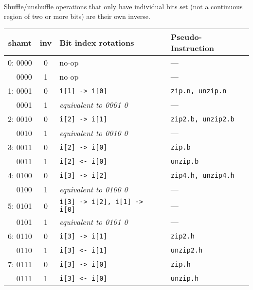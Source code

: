 Shuffle/unshuffle operations that only have individual bits set (not a continuous
region of two or more bits) are their own inverse.

\begin{table}[h]
\begin{small}
\begin{center}
\begin{tabular}{r c l l}
\multicolumn{1}{c}{shamt} &
\multicolumn{1}{c}{inv} &
Bit index rotations &
Pseudo-Instruction \\

\hline

 0: 0000 & 0 & no-op                            & ---                    \\
    0000 & 1 & no-op                            & ---                    \\
 1: 0001 & 0 & {\tt i[1] -> i[0]}               & {\tt zip.n, unzip.n}   \\
    0001 & 1 & {\it equivalent to 0001 0}       & ---                    \\
 2: 0010 & 0 & {\tt i[2] -> i[1]}               & {\tt zip2.b, unzip2.b} \\
    0010 & 1 & {\it equivalent to 0010 0}       & ---                    \\
 3: 0011 & 0 & {\tt i[2] -> i[0]}               & {\tt zip.b}            \\
    0011 & 1 & {\tt i[2] <- i[0]}               & {\tt unzip.b}          \\

\hline

 4: 0100 & 0 & {\tt i[3] -> i[2]}               & {\tt zip4.h, unzip4.h} \\
    0100 & 1 & {\it equivalent to 0100 0}       & ---                    \\
 5: 0101 & 0 & {\tt i[3] -> i[2], i[1] -> i[0]} & ---                    \\
    0101 & 1 & {\it equivalent to 0101 0}       & ---                    \\
 6: 0110 & 0 & {\tt i[3] -> i[1]}               & {\tt zip2.h}           \\
    0110 & 1 & {\tt i[3] <- i[1]}               & {\tt unzip2.h}         \\
 7: 0111 & 0 & {\tt i[3] -> i[0]}               & {\tt zip.h}            \\
    0111 & 1 & {\tt i[3] <- i[0]}               & {\tt unzip.h}          \\


\end{tabular}
\end{center}
\end{small}
\end{table}
